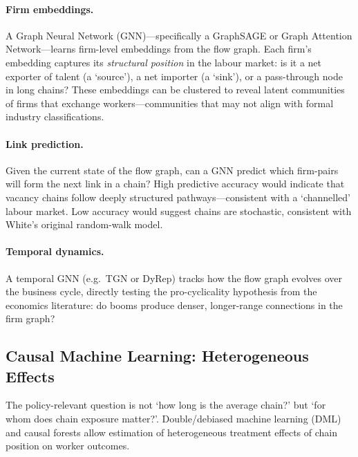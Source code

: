 \documentclass[a4paper]{tufte-handout}
\begin{document}
\paragraph{Firm embeddings.}
A Graph Neural Network (GNN)---specifically a GraphSAGE or Graph Attention Network---learns firm-level embeddings from the flow graph.
Each firm's embedding captures its \emph{structural position} in the labour market: is it a net exporter of talent (a `source'), a net importer (a `sink'), or a pass-through node in long chains? These embeddings can be clustered to reveal latent communities of firms that exchange workers---communities that may not align with formal industry classifications.

\paragraph{Link prediction.}
Given the current state of the flow graph, can a GNN predict which firm-pairs will form the next link in a chain? High predictive accuracy would indicate that vacancy chains follow deeply structured pathways---consistent with a `channelled' labour market. Low accuracy would suggest chains are stochastic, consistent with White's original random-walk model.

\paragraph{Temporal dynamics.}
A temporal GNN (e.g.\ TGN or DyRep) tracks how the flow graph evolves over the business cycle, directly testing the pro-cyclicality hypothesis from the economics literature: do booms produce denser, longer-range connections in the firm graph?


\subsection{Causal Machine Learning: Heterogeneous Effects}

The policy-relevant question is not `how long is the average chain?' but `for whom does chain exposure matter?'. Double/debiased machine learning (DML) and causal forests allow estimation of heterogeneous treatment effects of chain position on worker outcomes.
\end{document}
